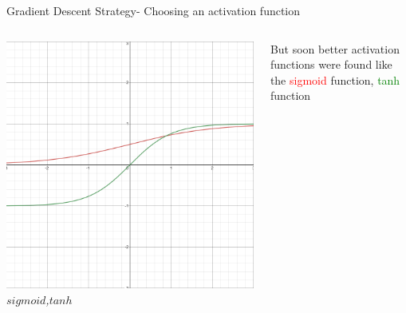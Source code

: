 \begin{frame}{Gradient Descent Strategy- Choosing an activation function}
	\begin{columns}[T]
        \begin{column}{0.5\textwidth}
        	\includegraphics[width=\textwidth]{images/tanh.png}
        	\tiny{\textit{$sigmoid$,$tanh$}}
        \end{column}
	    \begin{column}{0.5\textwidth}
    	    But soon better activation functions were found like the \textcolor{red}{sigmoid} function, \textcolor{green}{tanh} function
    	\end{column}
    \end{columns}
\end{frame}


